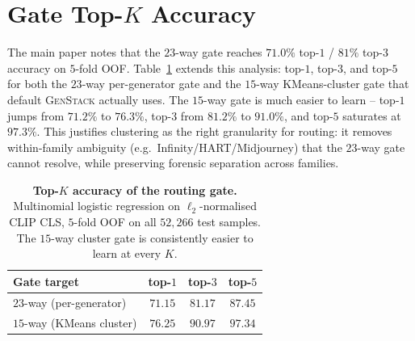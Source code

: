 \documentclass[10pt,twocolumn,letterpaper]{article}
\begin{document}
\section{Gate Top-$K$ Accuracy}
\label{sec:gate_topk}

The main paper notes that the $23$-way gate reaches $71.0\%$ top-$1$ / $81\%$ top-$3$ accuracy on $5$-fold OOF. Table~\ref{tab:gate_topk} extends this analysis: top-$1$, top-$3$, and top-$5$ for both the $23$-way per-generator gate and the $15$-way KMeans-cluster gate that default \textsc{GenStack} actually uses. The $15$-way gate is much easier to learn -- top-$1$ jumps from $71.2\%$ to $76.3\%$, top-$3$ from $81.2\%$ to $91.0\%$, and top-$5$ saturates at $97.3\%$. This justifies clustering as the right granularity for routing: it removes within-family ambiguity (e.g.\ Infinity/HART/Midjourney) that the $23$-way gate cannot resolve, while preserving forensic separation across families.

\begin{table}[h]
\centering
\footnotesize
\setlength{\tabcolsep}{6pt}
\caption{\textbf{Top-$K$ accuracy of the routing gate.} Multinomial logistic regression on $\ell_2$-normalised CLIP CLS, $5$-fold OOF on all $52{,}266$ test samples. The $15$-way cluster gate is consistently easier to learn at every $K$.}
\label{tab:gate_topk}
\begin{tabular}{l c c c}
\toprule
Gate target & top-$1$ & top-$3$ & top-$5$ \\
\midrule
$23$-way (per-generator)   & $71.15$ & $81.17$ & $87.45$ \\
$15$-way (KMeans cluster)  & $\mathbf{76.25}$ & $\mathbf{90.97}$ & $\mathbf{97.34}$ \\
\bottomrule
\end{tabular}
\end{table}
\end{document}
